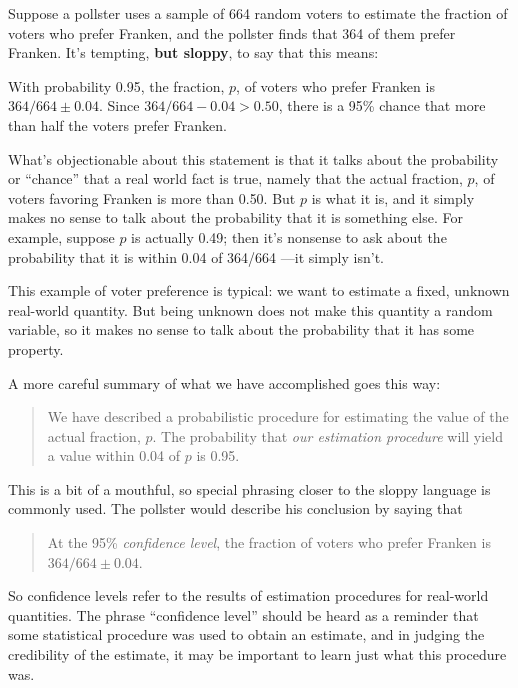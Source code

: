 Suppose a pollster uses a sample of 664 random voters to estimate the
fraction of voters who prefer Franken, and the pollster finds that 364 of
them prefer Franken.  It's tempting, \textbf{but sloppy}, to say that this
means:
\begin{falseclm*}
With probability 0.95, the fraction, $p$, of voters who prefer
Franken is $364/664 \pm 0.04$.  Since $364/664 -0.04 >0.50$, there is a 95\%
chance that more than half the voters prefer Franken.
\end{falseclm*}
What's objectionable about this statement is that it talks about the
probability or ``chance'' that a real world fact is true, namely that the
actual fraction, $p$, of voters favoring Franken is more than 0.50.  But $p$
is what it is, and it simply makes no sense to talk about the probability
that it is something else.  For example, suppose $p$ is actually 0.49;
then it's nonsense to ask about the probability that it is within 0.04 of
364/664 ---it simply isn't.

This example of voter preference is typical: we want to estimate a fixed,
unknown real-world quantity.  But being unknown does not make this
quantity a random variable, so it makes no sense to talk about the
probability that it has some property.

A more careful summary of what we have accomplished goes this way:
\begin{quote}
We have described a probabilistic procedure for estimating the value of
the actual fraction, $p$.  The probability that \emph{our estimation
procedure} will yield a value within 0.04 of $p$ is 0.95.
\end{quote}
This is a bit of a mouthful, so special phrasing closer to the sloppy
language is commonly used.  The pollster would describe his conclusion by
saying that
\begin{quote}
At the 95\% \emph{confidence level}, the fraction of voters
who prefer Franken is $364/664 \pm 0.04$.
\end{quote}

So confidence levels refer to the results of estimation procedures for
real-world quantities.  The phrase ``confidence level'' should be heard as
a reminder that some statistical procedure was used to obtain an estimate,
and in judging the credibility of the estimate, it may be important to
learn just what this procedure was.

\iffalse So adding 1 to both the numerator and denominator increases the
quotient,
\footnote{
If $0 < a < b$, then
\[
\frac{a}{b} < \frac{a+1}{b+1},
\]
because
\[
\frac{a}{b} = \frac{a(1+1/b)}{b(1+1/b)} = \frac{a+a/b}{b+1} < \frac{a+1}{b+1}.
\]} and the bound~\eqref{LN12:wnsol} simplifies to $(q/p)^n/(q/p)^T
= (p/q)^{T-n}$,\fi

